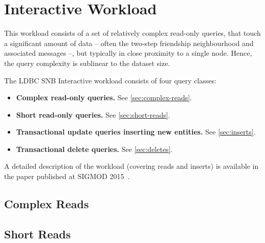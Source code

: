 \chapter{Interactive Workload}
\label{section:interactive}

This workload consists of a set of relatively complex read-only queries, that touch a significant
amount of data -- often the two-step friendship neighbourhood and associated messages --, but typically in close proximity to a single node. Hence, the query complexity is sublinear to the dataset size.

The LDBC SNB Interactive workload consists of four query classes:

\begin{itemize}
\item \textbf{Complex read-only queries.} See \autoref{sec:complex-reads}.
\item \textbf{Short read-only queries.} See \autoref{sec:short-reads}.
\item \textbf{Transactional update queries inserting new entities.} See \autoref{sec:inserts}.
\item \textbf{Transactional delete queries.} See \autoref{sec:deletes}.
\end{itemize}

A detailed description of the workload (covering reads and inserts) is available in the paper published at \mbox{SIGMOD} 2015~\cite{DBLP:conf/sigmod/ErlingALCGPPB15}.


\section{Complex Reads}
\label{sec:complex-reads}




\section{Short Reads}
\label{sec:short-reads}

